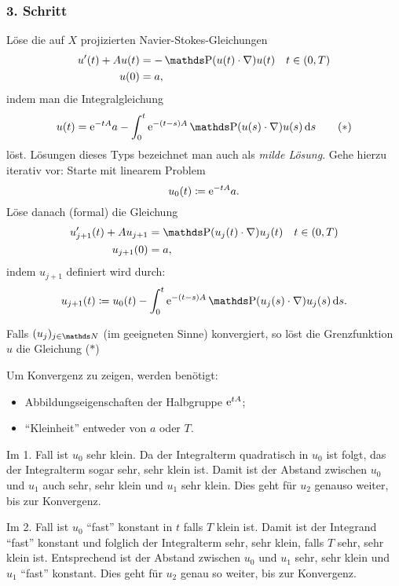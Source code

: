 \subsubsection*{3. Schritt}

Löse die auf $X$ projizierten Navier-Stokes-Gleichungen
\begin{align*}
  u'(t) + Au(t) &= -\PP(u(t) \cdot \nabla) u(t) \quad t \in (0,T) \\
  u(0) &= a,
\end{align*}
indem man die Integralgleichung
\begin{equation}
  u(t) = \e^{-tA} a - \int_0^t \e^{-(t - s)A} \PP(u(s) \cdot \nabla)u(s) \d s \tag{$\ast$}
\end{equation}
löst.
Lösungen dieses Typs bezeichnet man auch als \emph{milde Lösung}.
Gehe hierzu iterativ vor: Starte mit linearem Problem
$$
u_0(t) \coloneqq \mathrm{e}^{-tA} a.
$$
Löse danach (formal) die Gleichung
\begin{align*}
  u'_{j + 1}(t) + A u_{j + 1} &= \PP(u_j(t) \cdot \nabla) u_j(t) \quad t \in (0,T) \\
  u_{j + 1}(0) &= a,
\end{align*}
indem $u_{j + 1}$ definiert wird durch:
$$
u_{j + 1}(t) \coloneqq u_0(t) - \int_0^t \e^{-(t - s)A} \PP(u_j(s) \cdot \nabla) u_j(s) \d s.
$$

Falls $(u_j)_{j \in \N}$ (im geeigneten Sinne) konvergiert, so löst die Grenzfunktion $u$ die Gleichung ($\ast$)

Um Konvergenz zu zeigen, werden benötigt:
\begin{itemize}
  \item Abbildungseigenschaften der Halbgruppe $\mathrm{e}^{tA}$;
  \item ``Kleinheit'' entweder von $a$ oder $T$.
\end{itemize}

Im 1. Fall ist $u_0$ sehr klein.
Da der Integralterm quadratisch in $u_0$ ist folgt, das der Integralterm sogar sehr, sehr klein ist. 
Damit ist der Abstand zwischen $u_0$ und $u_1$ auch sehr, sehr klein und $u_1$ sehr klein. Dies geht für $u_2$ genauso weiter, bis zur Konvergenz.

Im 2. Fall ist $u_0$ ``fast'' konstant in $t$ falls $T$ klein ist. 
Damit ist der Integrand ``fast'' konstant und folglich der Integralterm sehr, sehr klein, falls $T$ sehr, sehr klein ist.
Entsprechend ist der Abstand zwischen $u_0$ und $u_1$ sehr, sehr klein und $u_1$ ``fast'' konstant.
Dies geht für $u_2$ genau so weiter, bis zur Konvergenz.
